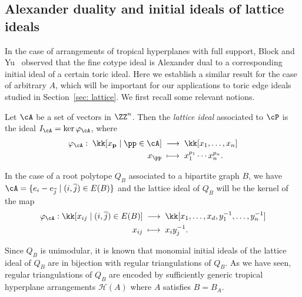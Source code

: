 \subsection{Alexander duality and initial ideals of lattice ideals}
In the case of arrangements of tropical hyperplanes with full support, Block and Yu~\cite{block2006tropical} observed that the fine cotype ideal is Alexander dual to a corresponding initial ideal of a certain toric ideal.  Here we establish a similar result for the case of arbitrary $A$, which will be important for our applications to toric edge ideals studied in Section~\ref{sec: lattice}.  We first recall some relevant notions.

\begin{definition}\label{def: latticeIdeal} Let $\cA$ be a set of vectors in $\ZZ^n$. Then the \textit{lattice ideal} associated to $\cP$ is the ideal $I_\cA = \ker \varphi_\cA$, where
\begin{align*}
\varphi_\cA: \; \kk[ x_\mathbf{p}\mid \pp\in \cA] & \; \longrightarrow  \;\kk[x_1,\dots, x_n]\\
x_{\pp} & \;\longmapsto \; x_1^{p_1}\cdots x_n^{p_n}.
\end{align*}
\end{definition}


In the case of a root polytope $Q_B$ associated to a bipartite graph $B$,  we have $\cA = \{e_i - e_{\overline j} \mid (i,\overline{j})\in E(B)\}$ and the lattice ideal of $Q_B$ will be the kernel of the map
\begin{align}\label{eq: latticeIdeal}
\begin{split}
\varphi_\cA: \kk[x_{ij} \mid  (i,\overline{j})\in E(B)] \; &\longrightarrow \; \kk[x_1,\dots, x_d, y_1^{-1},\dots, y_n^{-1}]\\
x_{ij}\; &\longmapsto \; x_i y_j^{-1}.
\end{split}
\end{align}

\begin{remark}
Since $Q_B$ is unimodular, it is known that monomial initial ideals of the lattice ideal of $Q_B$ are in bijection with regular triangulations of $Q_B$.  As we have seen, regular triangulations of $Q_B$ are encoded by sufficiently generic tropical hyperplane arrangements ${\mathcal H}(A)$ where $A$ satisfies $B = B_A$.
\end{remark}

